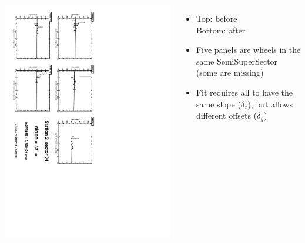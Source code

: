 \documentclass[compress]{beamer}
\begin{document}
\begin{frame}
\begin{columns}
\vfill
\includegraphics[height=\linewidth, angle=90]{zfits_after/zfit_2_04.pdf}
\begin{itemize}
\item Top: before \\ Bottom: after
\item Five panels are wheels in the same SemiSuperSector (some are missing)
\item Fit requires all to have the same slope ($\delta_z$), but allows different offsets ($\delta_y$)
\end{itemize}
\end{columns}
\end{frame}
\end{document}
